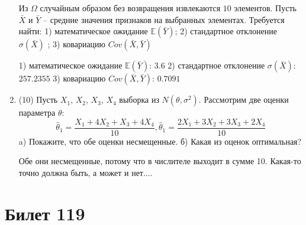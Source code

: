 \documentclass[a4paper,12pt]{article}
\begin{document}
\begin{enumerate}
Из $\Omega$ случайным образом без возвращения извлекаются $10$ элементов. 
Пусть $\bar X$ и $\bar Y$ – средние значения признаков на выбранных элементах. 
Требуется найти: 1) математическое ожидание $\mathbb{E}(\bar Y)$; 2) стандартное отклонение $\sigma(\bar X)$ ; 
3) ковариацию $Cov(\bar X, \bar Y)$




1) математическое ожидание $\mathbb{E}(\bar Y)$: $3.6$ 
2) стандартное отклонение $\sigma(\bar X)$: $257.2355$
3) ковариацию $Cov(\bar X, \bar Y)$: $0.7091$


\item


(10) Пусть $X _{1}$, $X _{2}$, $X _{3}$, $X _{4}$ выборка из $N(\theta, \sigma ^{2})$. Рассмотрим две оценки параметра $\theta$:
\[\hat \theta _{1} = \frac{X _{1} + 4X _{2} + X _{3} + 4X _{4}}{10}, \hat \theta _{1} = \frac{2X _{1} + 3X _{2} + 3X _{3} + 2X _{4}}{10}\]
a) Покажите, что обе оценки несмещенные.
б) Какая из оценок оптимальная?




Обе они несмещенные, потому что в числителе выходит в сумме 10.
Какая-то точно должна быть, а может и нет....



\end{enumerate}

\section{Билет 119}
\end{document}
